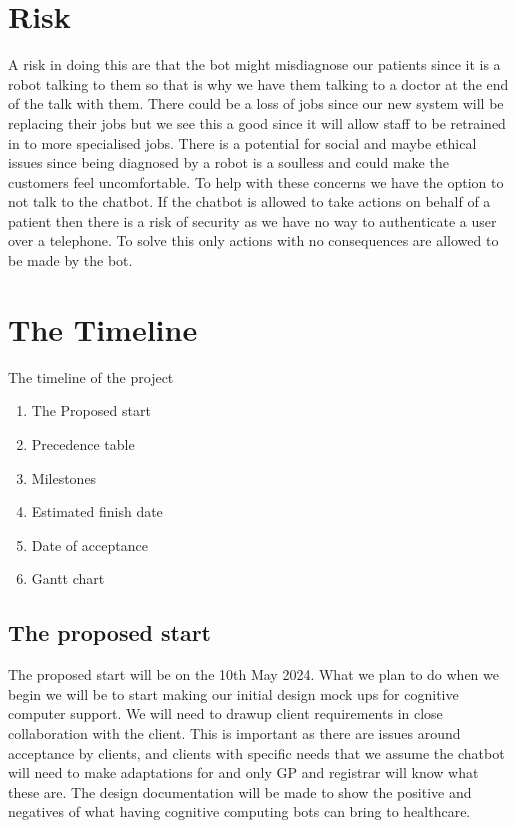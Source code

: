 \documentclass{article}
\begin{document}
\section{Risk}
A risk in doing this are that the bot might misdiagnose our patients since it is a robot talking to them so that is why we have them talking to a doctor at the end of the talk with them. There could be a loss of jobs since our new system will be replacing their jobs but we see this a good since it will allow staff to be retrained in to more specialised jobs. 
There is a potential for social and maybe ethical issues since being diagnosed by a robot is a soulless and could make the customers feel uncomfortable. To help with these concerns we have the option to not talk to the chatbot.
If the chatbot is allowed to take actions on behalf of a patient then there is a risk of security as we have no way to authenticate a user over a telephone. To solve this only actions with no consequences are allowed to be made by the bot.

\section{The Timeline}
The timeline of the project
\begin{enumerate}
	\item The Proposed start
	\item Precedence table
	\item Milestones
	\item Estimated finish date
	\item Date of acceptance 
	\item Gantt chart
\end{enumerate}

\subsection{The proposed start}
The proposed start will be on the 10th May 2024. What we plan to do when we begin we will be to start making our initial design mock ups for cognitive computer support.
We will need to drawup client requirements in close collaboration with the client. This is important as there are issues around acceptance by clients, and clients with specific needs that we assume the chatbot will need to make adaptations for and only GP and registrar will know what these are.
The design documentation will be made to show the positive and negatives of what having cognitive computing bots can bring to healthcare.
\end{document}

